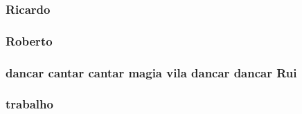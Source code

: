 \subsubsection[{\texorpdfstring{Ricardo}{Ricardo}}]{\setlength{\rightskip}{0pt plus 5cm}Ricardo}\hypertarget{candidatos_8txt_a508a855615268f4003a2dcef768b5abe}{}\label{candidatos_8txt_a508a855615268f4003a2dcef768b5abe}
\subsubsection[{\texorpdfstring{Roberto}{Roberto}}]{\setlength{\rightskip}{0pt plus 5cm}Roberto}\hypertarget{candidatos_8txt_ae97c2e40b26f85d0c45fbaf917d77502}{}\label{candidatos_8txt_ae97c2e40b26f85d0c45fbaf917d77502}
\subsubsection[{\texorpdfstring{Rui}{Rui}}]{ {\bf dancar} {\bf cantar} {\bf cantar} {\bf magia} vila {\bf dancar} {\bf dancar} Rui}\hypertarget{candidatos_8txt_afae26757e6180cef120017b01ac06140}{}\label{candidatos_8txt_afae26757e6180cef120017b01ac06140}
\subsubsection[{\texorpdfstring{trabalho}{trabalho}}]{\setlength{\rightskip}{0pt plus 5cm}trabalho}\hypertarget{candidatos_8txt_ad6339a08af3e0ee859de202f9944116b}{}\label{candidatos_8txt_ad6339a08af3e0ee859de202f9944116b}
